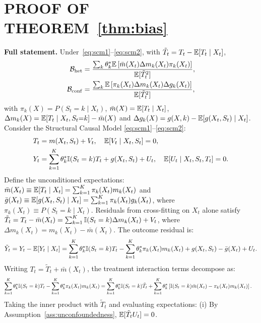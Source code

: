 \section{PROOF OF THEOREM~\ref{thm:bias}}
\label{app:proof_thm1}
\textbf{Full statement.} Under~\eqref{eq:scm1}--\eqref{eq:scm2}, with $\tilde T_t=T_t-\mathbb{E}[T_t\mid X_t]$,
\begin{align}
\mathcal{B}_{\mathrm{het}} &= \frac{\sum_{k} \theta_k^* \mathbb{E}\left[ \bar{m}(X_t) \Delta m_k(X_t) \pi_k(X_t) \right]}{\mathbb{E}[\tilde{T}_t^2]}, \label{eq:b_het} \\
\mathcal{B}_{\mathrm{conf}} &= \frac{\sum_{k} \mathbb{E}\left[ \pi_k(X_t) \Delta m_k(X_t) \Delta g_k(X_t) \right]}{\mathbb{E}[\tilde{T}_t^2]}, \label{eq:b_conf}
\end{align}
with $\pi_k(X)=P(S_t{=}k\mid X_t)$, $\bar m(X)=\mathbb{E}[T_t\mid X_t]$, $\Delta m_k(X)=\mathbb{E}[T_t\mid X_t,S_t{=}k]-\bar m(X)$ and $\Delta g_k(X)=g(X,k)-\mathbb{E}[g(X_t,S_t)\mid X_t]$.
Consider the Structural Causal Model \eqref{eq:scm1}--\eqref{eq:scm2}:
\begin{align*}
    T_t &= m(X_t, S_t) + V_t, \quad \mathbb{E}[V_t \mid X_t, S_t] = 0, \\
    Y_t &= \sum_{k=1}^K \theta_k^* \mathbb{I}(S_t = k) T_t + g(X_t, S_t) + U_t, \quad \mathbb{E}[U_t \mid X_t, S_t, T_t] = 0.
\end{align*}
Define the unconditioned expectations: $\bar{m}(X_t) \equiv \mathbb{E}[T_t \mid X_t] = \sum_{k=1}^K \pi_k(X_t) m_k(X_t)$ and $\bar{g}(X_t) \equiv \mathbb{E}[g(X_t, S_t) \mid X_t] = \sum_{k=1}^K \pi_k(X_t) g_k(X_t)$, where $\pi_k(X_t) \equiv P(S_t = k \mid X_t)$.
Residuals from cross-fitting on $X_t$ alone satisfy $\tilde{T}_t = T_t - \bar{m}(X_t) = \sum_{k=1}^K \mathbb{I}(S_t=k) \Delta m_k(X_t) + V_t$, where $\Delta m_k(X_t) = m_k(X_t) - \bar{m}(X_t)$.
The outcome residual is:
\begin{equation}
    \tilde{Y}_t = Y_t - \mathbb{E}[Y_t \mid X_t] = \sum_{k=1}^K \theta_k^* \mathbb{I}(S_t=k) T_t - \sum_{k=1}^K \theta_k^* \pi_k(X_t) m_k(X_t) + g(X_t, S_t) - \bar{g}(X_t) + U_t.
\end{equation}
Writing $T_t = \tilde{T}_t + \bar{m}(X_t)$, the treatment interaction terms decompose as:
\begin{align}
    \sum_{k=1}^K \theta_k^* \mathbb{I}(S_t=k) T_t - \sum_{k=1}^K \theta_k^* \pi_k(X_t) m_k(X_t) &= \sum_{k=1}^K \theta_k^* \mathbb{I}(S_t=k)\tilde{T}_t + \sum_{k=1}^K \theta_k^* \left[\mathbb{I}(S_t=k)\bar{m}(X_t) - \pi_k(X_t)m_k(X_t)\right].
\end{align}
Taking the inner product with $\tilde{T}_t$ and evaluating expectations:
(i) By Assumption~\ref{ass:unconfoundedness}, $\mathbb{E}[\tilde{T}_t U_t] = 0$.
